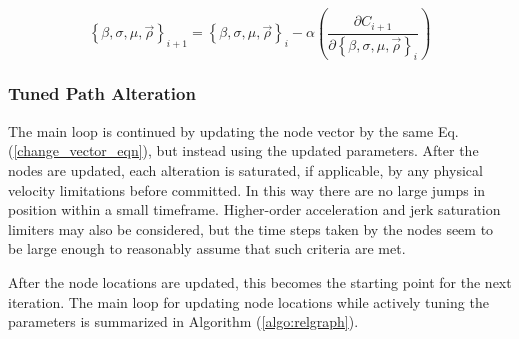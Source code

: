 \documentclass[conf]{new-aiaa}
\begin{document}
\begin{equation}
\label{gradient-descent}
\left\{\beta, \sigma, \mu, \vec{\rho}\right\}_{i + 1} = \left\{\beta, \sigma, \mu, \vec{\rho}\right\}_i - \alpha\left(\frac{\partial{C_{i + 1}}}{\partial{\left\{\beta, \sigma, \mu, \vec{\rho}\right\}_i}}\right)
\end{equation}


\subsubsection{Tuned Path Alteration}
The main loop is continued by updating the node vector by the same Eq. (\ref{change_vector_eqn}), but instead using the updated parameters. After the nodes are updated, each alteration is saturated, if applicable, by any physical velocity limitations before committed. In this way there are no large jumps in position within a small timeframe. Higher-order acceleration and jerk saturation limiters may also be considered, but the time steps taken by the nodes seem to be large enough to reasonably assume that such criteria are met.

After the node locations are updated, this becomes the starting point for the next iteration. The main loop for updating node locations while actively tuning the parameters is summarized in Algorithm (\ref{algo:relgraph}).
\end{document}
